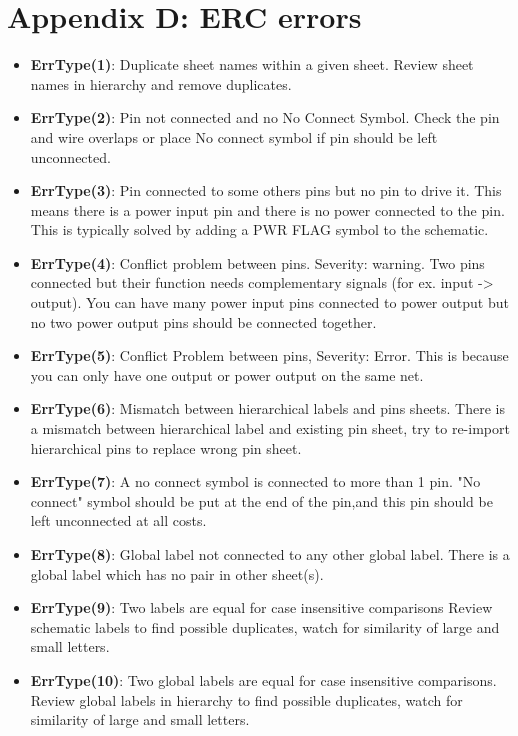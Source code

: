 \section {Appendix D: ERC errors}

\begin {itemize}

\item{\textbf{ErrType(1)}}: Duplicate sheet names within a given sheet.
Review sheet names in hierarchy and remove duplicates. 

\item{\textbf{ErrType(2)}}: Pin not connected and no No Connect Symbol.
Check the pin and wire overlaps or place No connect symbol if pin should be left unconnected.
 
\item{\textbf{ErrType(3)}}: Pin connected to some others pins but no pin to drive it.
This means there is a power input pin and there is no power connected to the pin. This is typically solved by adding a PWR FLAG symbol to the schematic.
 
\item{\textbf{ErrType(4)}}: Conflict problem between pins. Severity: warning.
Two pins connected but their function needs complementary signals (for ex. input -> output). You can have many power input pins connected to power output but no two power output pins should be connected together.

\item{\textbf{ErrType(5)}}: Conflict Problem between pins, Severity: Error. 
This is because you can only have one output or power output on the same net. 

\item{\textbf{ErrType(6)}}: Mismatch between hierarchical labels and pins sheets. 
There is a mismatch between hierarchical label and existing pin sheet, try to re-import hierarchical pins to replace wrong pin sheet. 

\item{\textbf{ErrType(7)}}: A no connect symbol is connected to more than 1 pin. 
"No connect" symbol should be put at the end of the pin,and this pin should be left unconnected at all costs.

\item{\textbf{ErrType(8)}}: Global label not connected to any other global label. 
There is a global label which has no pair in other sheet(s). 

\item{\textbf{ErrType(9)}}: Two labels are equal for case insensitive comparisons 
Review schematic labels to find possible duplicates, watch for similarity of large and small letters. 

\item{\textbf{ErrType(10)}}: Two global labels are equal for case insensitive comparisons. 
Review global labels in hierarchy to find possible duplicates, watch for similarity of large and small letters.

\end {itemize}
\pagebreak

